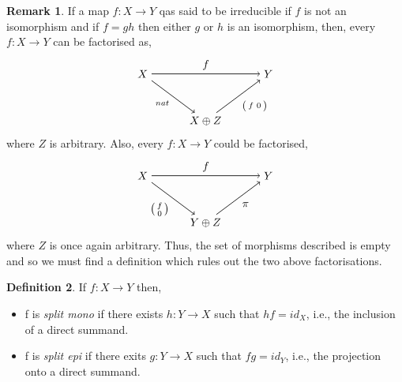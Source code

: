 \documentclass[11.5pt, twoside, a4paper, titlepage]{report}
\theoremstyle{definition}
\newtheorem{mydef}{Definition}[section]
\newtheorem{rem}[mydef]{Remark}
\theoremstyle{plain}
\begin{document}
\begin{rem}
If a map $f: X \to Y$ qas said to be irreducible if $f$ is not an isomorphism and if $f=gh$ then either $g$ or $h$ is an isomorphism, then, every $f:X \to Y$ can be factorised as,
\begin{equation*}
\begin{tikzpicture}[->,-latex, auto, main path/.style={->, semithick}, main node/.style={}]
\node	[main node]		(1) at (0,0)		{$X$};
\node [main node]		(2) at (4,0)		{$Y$};
\node [main node]		(3) at (2,-1.5)	{$X\oplus Z$};

\draw (1) [main path] edge node [auto] {$f$} (2);
\draw (1) [main path] edge node [auto, swap] {$\scriptstyle{nat}$} (3);
\draw (3) [main path] edge node [auto, swap] {$\left(\begin{smallmatrix}f & 0 \end{smallmatrix}\right)$} (2);
\end{tikzpicture}
\end{equation*}
where $Z$ is arbitrary. Also, every $f: X \to Y$ could be factorised, 
\begin{equation*}
\begin{tikzpicture}[->,-latex, auto, main path/.style={->, semithick}, main node/.style={}]
\node	[main node]		(1) at (0,0)		{$X$};
\node [main node]		(2) at (4,0)		{$Y$};
\node [main node]		(3) at (2,-1.5)	{$Y\oplus Z$};

\draw (1) [main path] edge node [auto] {$f$} (2);
\draw (1) [main path] edge node [auto, swap] {$\left(\begin{smallmatrix}f \\ 0 \end{smallmatrix}\right)$} (3);
\draw (3) [main path] edge node [auto, swap] {$\pi$} (2);
\end{tikzpicture}
\end{equation*}
where $Z$ is once again arbitrary.
Thus, the set of morphisms described is empty and so we must find a definition which rules out the two above factorisations.
\end{rem}

\begin{mydef}
If $f: X \to Y$ then,
\begin{itemize}
\item f is \emph{split mono} if there exists $h: Y \to X$ such that $hf=id_X$, i.e., the inclusion of a direct summand.
\item f is \emph{split epi} if there exits $g: Y \to X$ such that $fg=id_Y$, i.e., the projection onto a direct summand.
\end{itemize}
\end{mydef}
\end{document}
